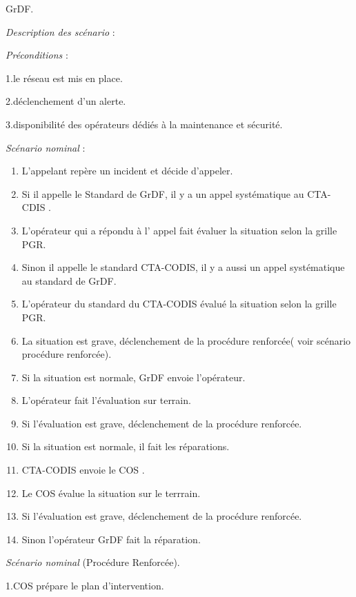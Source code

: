 \documentclass[
12pt,
french,                           %
a4paper,
]{article}
\begin{document}
GrDF.

\emph{Description des scénario} :

\emph{Préconditions} :

1.le réseau est mis en place.

2.déclenchement d'un alerte.

3.disponibilité des opérateurs dédiés à la maintenance et sécurité.

\emph{Scénario nominal} :

\begin{enumerate}[1.]
\item
  L'appelant repère un incident et décide d'appeler.
\item
  Si il appelle le Standard de GrDF, il y a un appel systématique au
  CTA-CDIS .
\item
  L'opérateur qui a répondu à l' appel fait évaluer la situation selon
  la grille PGR.
\item
  Sinon il appelle le standard CTA-CODIS, il y a aussi un appel
  systématique au standard de GrDF.
\item
  L'opérateur du standard du CTA-CODIS évalué la situation selon la
  grille PGR.
\item
  La situation est grave, déclenchement de la procédure renforcée( voir
  scénario procédure renforcée).
\item
  Si la situation est normale, GrDF envoie l'opérateur.
\item
  L'opérateur fait l'évaluation sur terrain.
\item
  Si l'évaluation est grave, déclenchement de la procédure renforcée.
\item
  Si la situation est normale, il fait les réparations.
\item
  CTA-CODIS envoie le COS .
\item
  Le COS évalue la situation sur le terrrain.
\item
  Si l'évaluation est grave, déclenchement de la procédure renforcée.
\item
  Sinon l'opérateur GrDF fait la réparation.
\end{enumerate}

\emph{Scénario nominal} (Procédure Renforcée).

1.COS prépare le plan d'intervention.
\end{document}
